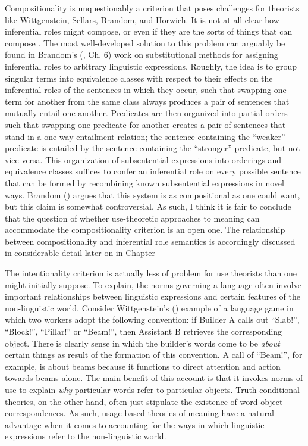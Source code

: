 Compositionality is unquestionably a criterion that poses challenges for theorists like Wittgenstein, Sellars, Brandom, and Horwich. It is not at all clear how inferential roles might compose, or even if they are the sorts of things that can compose \citep{FodorLepore:1991}. The most well-developed solution to this problem can arguably be found in Brandom's (\citeyear{Brandom:1994}, Ch. 6) work on substitutional methods for assigning inferential roles to arbitrary linguistic expressions. Roughly, the idea is to group singular terms into equivalence classes with respect to their effects on the inferential roles of the sentences in which they occur, such that swapping one term for another from the same class always produces a pair of sentences that mutually entail one another. Predicates are then organized into partial orders such that swapping one predicate for another creates a pair of sentences that stand in a one-way entailment relation; the sentence containing the ``weaker'' predicate is entailed by the sentence containing the ``stronger'' predicate, but not vice versa. This organization of subsentential expressions into orderings and equivalence classes suffices to confer an inferential role on every possible sentence that can be formed by recombining known subsentential expressions in novel ways. Brandom (\citeyear{Brandom:1994}) argues that this system is as compositional as one could want, but this claim is somewhat controversial. As such, I think it is fair to conclude that the question of whether use-theoretic approaches to meaning can accommodate the compositionality criterion is an open one. The relationship between compositionality and inferential role semantics is accordingly discussed in considerable detail later on in Chapter 

The intentionality criterion is actually less of problem for use theorists than one might initially suppose. To explain, the norms governing a language often involve important relationships between linguistic expressions and certain features of the non-linguistic world. Consider Wittgenstein's (\citeyear{Wittgenstein:1953}) example of a language game in which two workers adopt the following convention: if Builder A calls out ``Slab!'', ``Block!'', ``Pillar!'' or ``Beam!'', then Assistant B retrieves the corresponding object. There is clearly sense in which the builder's words come to be \textit{about} certain things as result of the formation of this convention. A call of ``Beam!'', for example, is about beams because it functions to direct attention and action towards beams alone. The main benefit of this account is that it invokes norms of use to explain \textit{why} particular words refer to particular objects. Truth-conditional theories, on the other hand, often just stipulate the existence of word-object correspondences. As such, usage-based theories of meaning have a natural advantage when it comes to accounting for the ways in which linguistic expressions refer to the non-linguistic world. 

